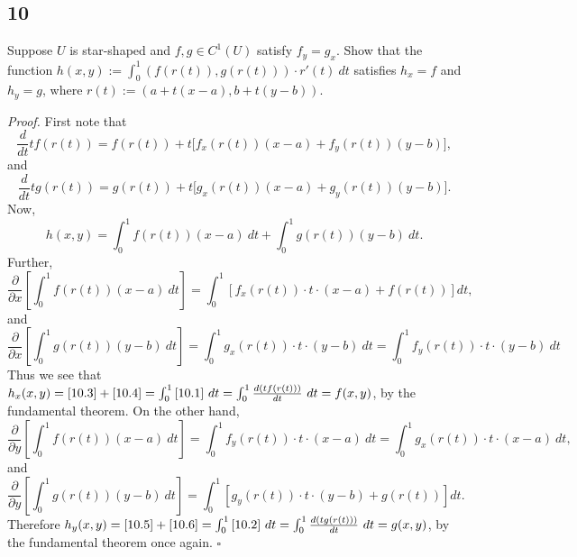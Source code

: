 \documentclass[12pt]{article}
\newcounter{ProofCounter}
\newenvironment{Proof}{\stepcounter{ProofCounter}\textit{Proof.}}{\hfill$\square$}
\begin{document}
\newpage
\subsection*{10}
\begin{tcolorbox}
Suppose $U$ is star-shaped and $f,g \in C^{1}(U)$ satisfy $f_{y} = g_{x}$. Show that the function $h(x,y) := \int_{0}^{1}(f(r(t)),g(r(t)))\cdot
r'(t)\ dt$ satisfies $h_{x} = f$ and $h_{y} = g$, where $r(t) := (a + t(x-a), b + t(y-b))$.
\end{tcolorbox}


\begin{Proof}
First note that 
\begin{equation}
\frac{d}{dt}t f(r(t)) = f(r(t)) + t\big[ f_{x}(r(t))(x-a) + f_{y}(r(t))(y-b)\big],
\label{10.1}
\end{equation}
and 
\begin{equation}
\frac{d}{dt}t g(r(t)) = g(r(t)) + t\big[ g_{x}(r(t))(x-a) + g_{y}(r(t))(y-b)\big].
\label{10.2}
\end{equation}
Now,
\[ h(x,y) = \int_{0}^{1} f(r(t))(x-a)\ dt + \int_{0}^{1} g(r(t))(y-b)\ dt. \]
Further, 
\begin{equation}
\frac{\partial}{\partial x}\left[ \int_{0}^{1}f(r(t))(x-a)\ dt \right] = \int_{0}^{1}\left[ f_{x}(r(t))\cdot t \cdot (x-a) + f(r(t)) \right]dt,
\label{10.3}
\end{equation}
and 
\begin{equation}
\frac{\partial}{\partial x} \left[ \int_{0}^{1}g(r(t))(y-b)\ dt \right] = \int_{0}^{1} g_{x}(r(t))\cdot t \cdot (y-b)\ dt = \int_{0}^{1}
f_{y}(r(t))\cdot t \cdot (y-b)\ dt
\label{10.4}
\end{equation}
Thus we see that $h_{x}(x,y) = \eqref{10.3} + \eqref{10.4} = \int_{0}^{1} \eqref{10.1}\ dt = \int_{0}^{1} \frac{d( t f(r(t)))}{dt}\ dt = f(x,y)$, by the
fundamental theorem. On the other hand,
\begin{equation}
\frac{\partial}{\partial y}\left[ \int_{0}^{1}f(r(t))(x-a)\ dt \right] = \int_{0}^{1}f_{y}(r(t))\cdot t \cdot (x-a)\ dt = \int_{0}^{1}g_{x}(r(t))\cdot
t \cdot (x-a)\ dt,
\label{10.5}
\end{equation}
and 
\begin{equation}
\frac{\partial}{\partial y}\left[ \int_{0}^{1}g(r(t))(y-b)\ dt \right] = \int_{0}^{1}\left[ g_{y}(r(t))\cdot t \cdot (y-b) + g(r(t)) \right]dt.
\label{10.6}
\end{equation}
Therefore $h_{y}(x,y) = \eqref{10.5} + \eqref{10.6} = \int_{0}^{1} \eqref{10.2}\ dt = \int_{0}^{1}\frac{d(t g(r(t)))}{dt}\ dt = g(x,y)$, by the
fundamental theorem once again.
\end{Proof}
\end{document}
